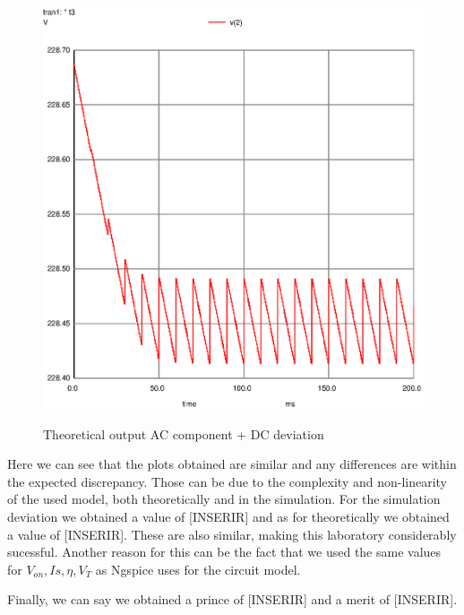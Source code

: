 \begin{figure}[!ht] \centering
\caption{Theoretical output AC component + DC deviation}
\includegraphics[width=0.6\linewidth]{venv.ps}
\label{fig:theo3}
\end{figure}
\newpage

Here we can see that the plots obtained are similar and any differences are within the expected discrepancy. Those can be due to the complexity and non-linearity of the used model, both theoretically and in the simulation. For the simulation deviation we obtained a value of [INSERIR] and as for theoretically we obtained a value of [INSERIR]. These are also similar, making this laboratory considerably sucessful. Another reason for this can be the fact that we used the same values for $V_{on}, Is, \eta, V_{T}$ as Ngspice uses for the circuit model.

Finally, we can say we obtained a prince of [INSERIR] and a merit of [INSERIR].

